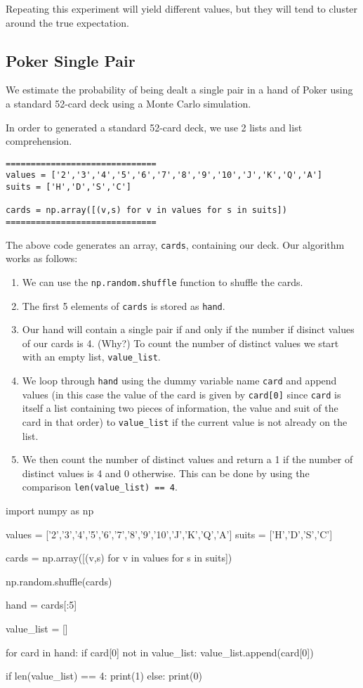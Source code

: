\documentclass{ximera}
\begin{document}
Repeating this experiment will yield different values, but they will tend to cluster around the true expectation. 

\subsection{Poker Single Pair}

We estimate the probability of being dealt a single pair in a hand of Poker using a standard 52-card deck using a Monte Carlo simulation.

In order to generated a standard 52-card deck, we use 2 lists and list comprehension.

\begin{verbatim}
==============================
values = ['2','3','4','5','6','7','8','9','10','J','K','Q','A']
suits = ['H','D','S','C']

cards = np.array([(v,s) for v in values for s in suits])
==============================
\end{verbatim}

The above code generates an array, \verb|cards|, containing our deck. Our algorithm works as follows:

\begin{enumerate}
	\item We can use the \verb|np.random.shuffle| function to shuffle the cards.
	\item The first 5 elements of \verb|cards| is stored as \verb|hand|. 
	\item Our hand will contain a single pair if and only if the number if disinct values of our cards is 4. (Why?) To count the number of distinct values we start with an empty list, \verb|value_list|. 
	\item We loop through \verb|hand| using the dummy variable name \verb|card| and append values (in this case the value of the card is given by \verb|card[0]| since \verb|card| is itself a list containing two pieces of information, the value and suit of the card in that order) to \verb|value_list| if the current value is not already on the list. 
	\item We then count the number of distinct values and return a 1 if the number of distinct values is 4 and 0 otherwise. This can be done by using the comparison \verb|len(value_list) == 4|.
\end{enumerate}

\begin{sageCell}
import numpy as np

values = ['2','3','4','5','6','7','8','9','10','J','K','Q','A']
suits = ['H','D','S','C']

cards = np.array([(v,s) for v in values for s in suits])

np.random.shuffle(cards)

hand = cards[:5]

value_list = []

for card in hand:
        if card[0] not in value_list:
                value_list.append(card[0])

if len(value_list) == 4:
        print(1)
else:
        print(0)
\end{sageCell}
\end{document}
